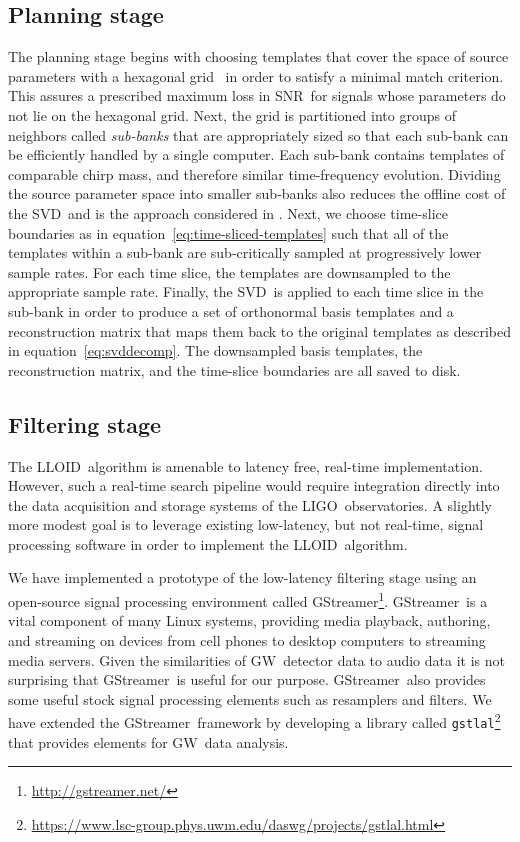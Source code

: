 \documentclass[preprint2]{aastex}
\newcommand{\GW}{GW}%
\newcommand{\LIGO}{LIGO}%
\newcommand{\SNR}{SNR}%
\newcommand{\SVD}{SVD}%
\newcommand{\gstlal}{{\tt gstlal}}
\newcommand{\gstreamer}{GStreamer}
\newcommand{\lloid}{LLOID}%
\begin{document}
\subsection{Planning stage}

The planning stage begins with choosing templates that cover the space of
source parameters with a hexagonal grid~\citep{PhysRevD.76.102004} in order to
satisfy a minimal match criterion.  This assures a prescribed maximum loss in
\SNR\ for signals whose parameters do not lie on the hexagonal grid.  Next, the
grid is partitioned into groups of neighbors called \emph{sub-banks} that
are appropriately sized so that each sub-bank can be efficiently handled by a
single computer.  Each sub-bank contains templates of comparable chirp mass, and
therefore similar time-frequency evolution.  Dividing the source
parameter space into smaller sub-banks also reduces the offline cost of the
\SVD\ and is the approach considered in \citet{Cannon:2010p10398}.  Next, we choose
time-slice boundaries as in equation~\eqref{eq:time-sliced-templates} such that all
of the templates within a sub-bank are sub-critically sampled at progressively lower
sample rates.  For each time slice, the templates are downsampled to the
appropriate sample rate.  Finally, the \SVD\ is applied to each time slice in
the sub-bank in order to produce a set of orthonormal basis templates and a
reconstruction matrix that maps them back to the original templates as
described in equation~\eqref{eq:svddecomp}.  The downsampled basis templates,
the reconstruction matrix, and the time-slice boundaries are all saved to disk.

\subsection{Filtering stage}

The \lloid\ algorithm is amenable to latency free, real-time implementation.  However, such a real-time search pipeline would require integration directly into the data acquisition and storage systems of the \LIGO\ observatories.  A slightly more 
modest goal is to leverage existing low-latency, but not real-time, signal processing software in order to implement
the \lloid\ algorithm.

We have implemented a prototype of the low-latency filtering stage using an
open-source signal processing environment called
\gstreamer\footnote{\url{http://gstreamer.net/}}.
\gstreamer\ is a vital component of many Linux systems, providing media
playback, authoring, and streaming on devices from cell phones to desktop
computers to streaming media servers.  Given the similarities of
\GW\ detector data to audio data it is not surprising that
\gstreamer\ is useful for our purpose. \gstreamer\ also provides some useful
stock signal processing elements such as resamplers and filters.  We have
extended the \gstreamer\ framework by developing a library called
\gstlal\footnote{\url{https://www.lsc-group.phys.uwm.edu/daswg/projects/gstlal.html}}
that provides elements for \GW\ data analysis.
\end{document}
